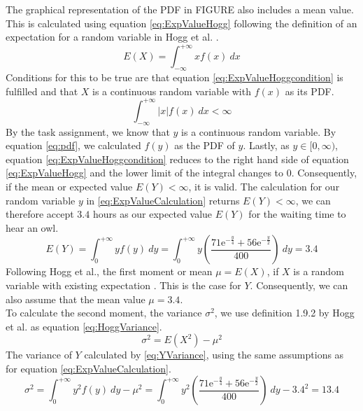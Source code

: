 The graphical representation of the PDF in FIGURE also includes a mean value. This is calculated using equation \ref{eq:ExpValueHogg} following the definition of an expectation for a random variable in Hogg et al. \cite[Definition~1.8.1]{hogg}.
\begin{equation}
E(X) = \int^{+\infty}_{-\infty} x f(x) ~ dx
\label{eq:ExpValueHogg}
\end{equation}
Conditions for this to be true are that equation \ref{eq:ExpValueHoggcondition} is fulfilled and that $X$ is a continuous random variable with $f(x)$ as its PDF.
\begin{equation}
\int^{+\infty}_{-\infty} |x| f(x) ~ dx < \infty
\label{eq:ExpValueHoggcondition}
\end{equation}
By the task assignment, we know that $y$ is a continuous random variable. By equation \ref{eq:pdf}, we calculated $f(y)$ as the PDF of $y$. Lastly, as $y \in [0,\infty)$, equation \ref{eq:ExpValueHoggcondition} reduces to the right hand side of equation \ref{eq:ExpValueHogg} and the lower limit of the integral changes to 0. Consequently, if the mean or expected value $E(Y) < \infty$, it is valid. The calculation for our random variable $y$ in \ref{eq:ExpValueCalculation} returns $E(Y) < \infty$, we can therefore accept $3.4$ hours as our expected value $E(Y)$ for the waiting time to hear an owl. 
%
\begin{equation}
E(Y) = \int^{+\infty}_{0} y f(y) ~ dy = \int^{+\infty}_{0} y(\dfrac{71\mathrm{e}^{-\frac{y}{4}}+56\mathrm{e}^{-\frac{y}{2}}}{400})~dy = 3.4
\label{eq:ExpValueCalculation}
\end{equation}
Following Hogg et al., the first moment or mean $\mu = E(X)$, if $X$ is a random variable with existing expectation \cite[Definition~1.9.1]{hogg}. This is the case for $Y$. Consequently, we can also assume that the mean value $\mu = 3.4$. 
\\

To calculate the second moment, the variance $\sigma^2$, we use definition 1.9.2 by Hogg et al. \cite{hogg} as equation \ref{eq:HoggVariance}.
\begin{equation}
\sigma^2 = E(X^2) - \mu^2
\label{eq:HoggVariance}
\end{equation}
%
The variance of $Y$ calculated by \ref{eq:YVariance}, using the same assumptions as for equation \ref{eq:ExpValueCalculation}.
\begin{equation}
\sigma^2 = \int^{+\infty}_{0} y^2 f(y) ~ dy - \mu^2
= \int^{+\infty}_{0} y^2(\dfrac{71\mathrm{e}^{-\frac{y}{4}}+56\mathrm{e}^{-\frac{y}{2}}}{400})~dy - 3.4^2
= 13.4
\label{eq:YVariance}
\end{equation}

